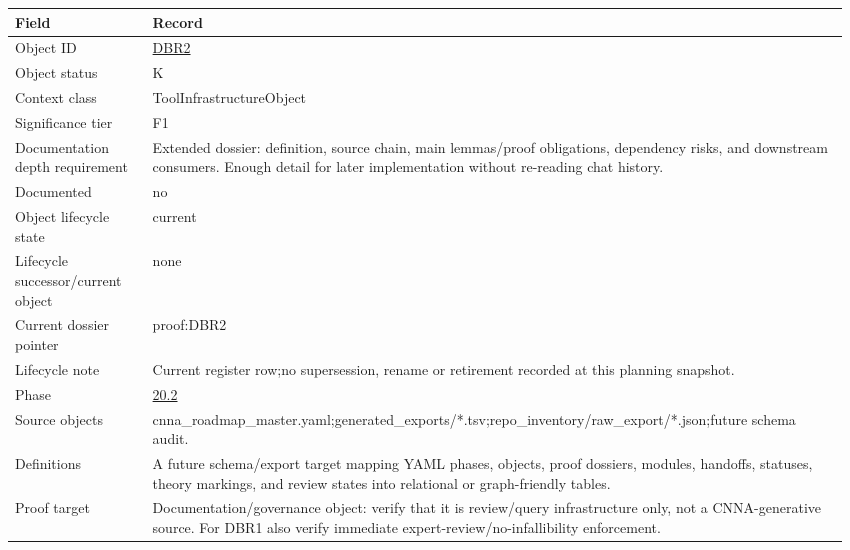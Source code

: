 \begin{longtable}{L{0.16\linewidth} L{0.81\linewidth}}
\hline
\textbf{Field} & \textbf{Record}\\
\hline
Object ID & \hyperlink{object-row-DBR2}{DBR2}\\
\hline\addlinespace[0.20em]
Object status & K\\
\hline\addlinespace[0.20em]
Context class & ToolInfrastructureObject\\
\hline\addlinespace[0.20em]
Significance tier & F1\\
\hline\addlinespace[0.20em]
Documentation depth requirement & Extended dossier: definition, source chain, main lemmas/\allowbreak{}proof obligations, dependency risks, and downstream consumers. Enough detail for later implementation without re-reading chat history.\\
\hline\addlinespace[0.20em]
Documented & no\\
\hline\addlinespace[0.20em]
Object lifecycle state & current\\
\hline\addlinespace[0.20em]
Lifecycle successor/\allowbreak{}current object & none\\
\hline\addlinespace[0.20em]
Current dossier pointer & proof:DBR2\\
\hline\addlinespace[0.20em]
Lifecycle note & Current register row;\newline no supersession, rename or retirement recorded at this planning snapshot.\\
\hline\addlinespace[0.20em]
Phase & \hyperlink{phase-row-20-2}{20.2}\\
\hline\addlinespace[0.20em]
Source objects & cnna\_roadmap\_master.yaml;\newline generated\_exports/\allowbreak{}*.tsv;\newline repo\_inventory/\allowbreak{}raw\_export/\allowbreak{}*.json;\newline future schema audit.\\
\hline\addlinespace[0.20em]
Definitions & A future schema/\allowbreak{}export target mapping YAML phases, objects, proof dossiers, modules, handoffs, statuses, theory markings, and review states into relational or graph-friendly tables.\\
\hline\addlinespace[0.20em]
Proof target & Documentation/\allowbreak{}governance object: verify that it is review/\allowbreak{}query infrastructure only, not a CNNA-generative source. For DBR1 also verify immediate expert-review/\allowbreak{}no-infallibility enforcement.\\

\end{longtable}
